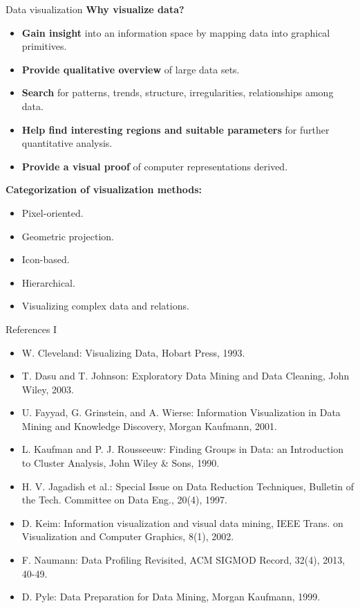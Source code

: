 \documentclass[aspectratio=169,t]{beamer}
\begin{document}
  { 
    \begin{frame}{Data visualization}
    \textbf{Why visualize data?}
    \begin{itemize}
      \item \textbf{Gain insight} into an information space by mapping data into graphical primitives.
      \item \textbf{Provide qualitative overview} of large data sets.
      \item \textbf{Search} for patterns, trends, structure, irregularities, relationships among data.
      \item \textbf{Help find interesting regions and suitable parameters} for further quantitative analysis.
      \item \textbf{Provide a visual proof} of computer representations derived.
    \end{itemize}
    \textbf{Categorization of visualization methods:}
    \begin{itemize}
      \item Pixel-oriented.
      \item Geometric projection.
      \item Icon-based.
      \item Hierarchical.
      \item Visualizing complex data and relations.
    \end{itemize}
    \end{frame}
  }

  { 
    \begin{frame}{}

    \end{frame}
  }

  { 
    \begin{frame}{References I}
        \begin{itemize}
          \item W. Cleveland: Visualizing Data, Hobart Press, 1993.
          \item T. Dasu and T. Johnson: Exploratory Data Mining and Data Cleaning, John Wiley, 2003.
          \item U. Fayyad, G. Grinstein, and A. Wierse: Information Visualization in Data Mining and Knowledge Discovery, Morgan Kaufmann, 2001.
          \item L. Kaufman and P. J. Rousseeuw: Finding Groups in Data: an Introduction to Cluster Analysis, John Wiley \& Sons, 1990.
          \item H. V. Jagadish et al.: Special Issue on Data Reduction Techniques, Bulletin of the Tech. Committee on Data Eng., 20(4), 1997.
          \item D. Keim: Information visualization and visual data mining, IEEE Trans. on Visualization and Computer Graphics, 8(1), 2002.
          \item F. Naumann: Data Profiling Revisited, ACM SIGMOD Record, 32(4), 2013, 40-49.
          \item D. Pyle: Data Preparation for Data Mining, Morgan Kaufmann, 1999.
        \end{itemize}
    \end{frame}
  }
\end{document}
